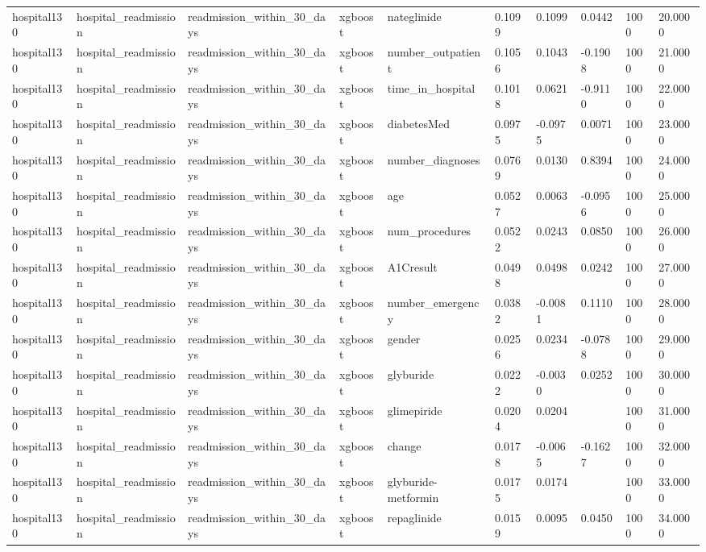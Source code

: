 \begin{tabular}{llllllllll}
hospital130 & hospital\_readmission & readmission\_within\_30\_days & xgboost & nateglinide & 0.1099 & 0.1099 & 0.0442 & 1000 & 20.0000 \\
hospital130 & hospital\_readmission & readmission\_within\_30\_days & xgboost & number\_outpatient & 0.1056 & 0.1043 & -0.1908 & 1000 & 21.0000 \\
hospital130 & hospital\_readmission & readmission\_within\_30\_days & xgboost & time\_in\_hospital & 0.1018 & 0.0621 & -0.9110 & 1000 & 22.0000 \\
hospital130 & hospital\_readmission & readmission\_within\_30\_days & xgboost & diabetesMed & 0.0975 & -0.0975 & 0.0071 & 1000 & 23.0000 \\
hospital130 & hospital\_readmission & readmission\_within\_30\_days & xgboost & number\_diagnoses & 0.0769 & 0.0130 & 0.8394 & 1000 & 24.0000 \\
hospital130 & hospital\_readmission & readmission\_within\_30\_days & xgboost & age & 0.0527 & 0.0063 & -0.0956 & 1000 & 25.0000 \\
hospital130 & hospital\_readmission & readmission\_within\_30\_days & xgboost & num\_procedures & 0.0522 & 0.0243 & 0.0850 & 1000 & 26.0000 \\
hospital130 & hospital\_readmission & readmission\_within\_30\_days & xgboost & A1Cresult & 0.0498 & 0.0498 & 0.0242 & 1000 & 27.0000 \\
hospital130 & hospital\_readmission & readmission\_within\_30\_days & xgboost & number\_emergency & 0.0382 & -0.0081 & 0.1110 & 1000 & 28.0000 \\
hospital130 & hospital\_readmission & readmission\_within\_30\_days & xgboost & gender & 0.0256 & 0.0234 & -0.0788 & 1000 & 29.0000 \\
hospital130 & hospital\_readmission & readmission\_within\_30\_days & xgboost & glyburide & 0.0222 & -0.0030 & 0.0252 & 1000 & 30.0000 \\
hospital130 & hospital\_readmission & readmission\_within\_30\_days & xgboost & glimepiride & 0.0204 & 0.0204 &  & 1000 & 31.0000 \\
hospital130 & hospital\_readmission & readmission\_within\_30\_days & xgboost & change & 0.0178 & -0.0065 & -0.1627 & 1000 & 32.0000 \\
hospital130 & hospital\_readmission & readmission\_within\_30\_days & xgboost & glyburide-metformin & 0.0175 & 0.0174 &  & 1000 & 33.0000 \\
hospital130 & hospital\_readmission & readmission\_within\_30\_days & xgboost & repaglinide & 0.0159 & 0.0095 & 0.0450 & 1000 & 34.0000 \\

\end{tabular}

